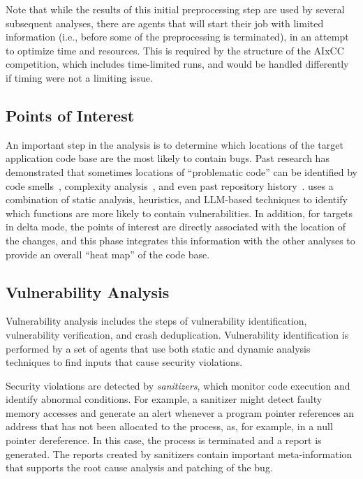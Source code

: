 Note that while the results of this initial preprocessing step are used by several subsequent analyses, there are agents that will start their job with limited information (i.e., before some of the preprocessing is terminated), in an attempt to optimize time and resources.
This is required by the structure of the AIxCC competition, which includes time-limited runs, and would be handled differently if timing were not a limiting issue.

\subsection{Points of Interest}

An important step in the analysis is to determine which locations of the target application code base are the most likely to contain bugs.
Past research has demonstrated that sometimes locations of ``problematic code'' can be identified by code smells~\cite{Neuhaus2007}, complexity analysis~\cite{Moshtari2013}, and even past repository history~\cite{meng2021:Bran}.
\artiphishell uses a combination of static analysis, heuristics, and LLM-based techniques to identify which functions are more likely to contain vulnerabilities.
In addition, for targets in delta mode, the points of interest are directly associated with the location of the changes, and this phase integrates this information with the other analyses to provide an overall ``heat map'' of the code base.

\subsection{Vulnerability Analysis}

Vulnerability analysis includes the steps of vulnerability identification, vulnerability verification, and crash deduplication.
Vulnerability identification is performed by a set of agents that use both static and dynamic analysis techniques to find inputs that cause security violations.

Security violations are detected by \emph{sanitizers}, which monitor code execution and identify abnormal conditions.
For example, a sanitizer might detect faulty memory accesses and generate an alert whenever a program pointer references an address that has not been allocated to the process, as, for example, in a null pointer dereference.
In this case, the process is terminated and a report is generated. 
The reports created by sanitizers contain important meta-information that supports the root cause analysis and patching of the bug.

